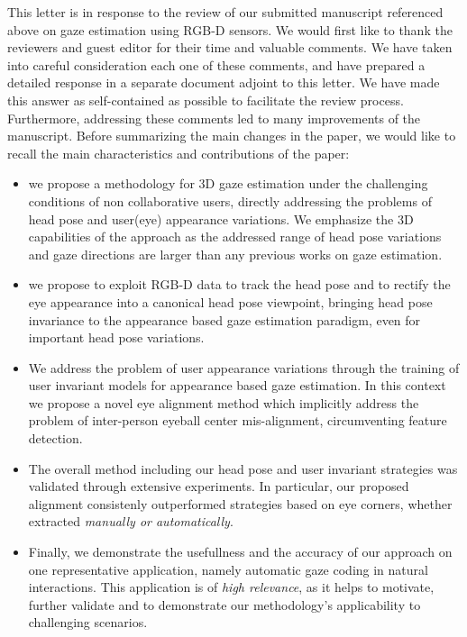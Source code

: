 \documentclass[12pt]{article}
\begin{document}
This letter is in response to the review of our submitted manuscript referenced above on 
gaze estimation using RGB-D sensors.
%
We would first like to thank  the reviewers and guest editor for their time and valuable comments.
We have taken into careful consideration each one of these comments, and have prepared a detailed response
in a separate document adjoint to this letter. 
We have made this answer as self-contained as possible to facilitate the review process.
%
Furthermore, addressing these comments led to many improvements of the manuscript. 
%
Before summarizing the main changes in the paper, we would like to recall the main characteristics and 
contributions of the paper:
\begin{itemize}
\item  we propose a methodology for 3D gaze estimation under the challenging conditions of non collaborative users,  directly addressing the problems of head pose and user(eye) appearance variations. 
We emphasize the 3D capabilities of the approach
as the addressed  range of head pose variations
and gaze directions are larger than any previous works on gaze estimation.
%
\item we propose to exploit RGB-D data to track the head pose and to rectify the eye
appearance into a canonical head pose viewpoint, bringing head pose invariance to the appearance based gaze
estimation paradigm, even for important head pose variations. 
\item We address the problem of user appearance variations through the training of user invariant models for appearance based gaze estimation. In this context we  propose a novel eye alignment method which implicitly 
address the problem of inter-person eyeball center mis-alignment, circumventing feature detection. 
%
\item The overall method including our head pose and user invariant strategies was validated through 
extensive experiments. 
%
In particular, our proposed alignment consistenly outperformed strategies based on eye corners, whether extracted 
{\em manually or automatically}. 
%
\item Finally, we demonstrate the usefullness and the accuracy of our approach on one representative application, 
namely automatic gaze coding in natural interactions. 
This application is of {\em high relevance}, as it helps to motivate, further validate  and to demonstrate
our methodology's applicability to challenging scenarios.
\end{itemize}
\end{document}
